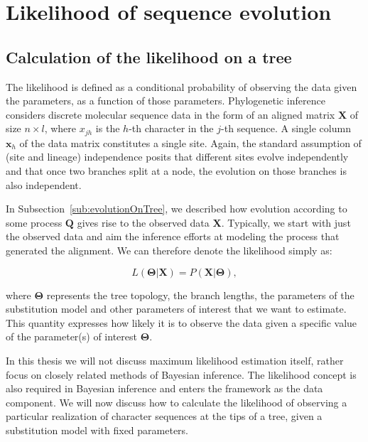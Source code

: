 \section{Likelihood of sequence evolution}

\subsection{Calculation of the likelihood on a tree\label{sub:likelihood}}

The likelihood is defined as a conditional probability of observing the data given the parameters, as a function of those parameters.
Phylogenetic inference considers discrete molecular sequence data in the form of an aligned matrix $\mathbf{X}$ of size $n \times l$, where $x_{jh}$ is the $h$-th character in the $j$-th sequence.
A single column $\mathbf{x}_{h}$ of the data matrix constitutes a single site.
Again, the standard assumption of (site and lineage) independence posits that different sites evolve independently and that once two branches split at a node, the evolution on those branches is also independent.

In Subsection~\ref{sub:evolutionOnTree}, we described how evolution according to some process $\mathbf{Q}$ gives rise to the observed data $\mathbf{X}$.
Typically, we start with just the observed data and aim the inference efforts at modeling the process that generated the alignment.
We can therefore denote the likelihood simply as: 

\begin{equation}
L\left(\mathbf{\Theta}|\mathbf{X}\right)=P\left( \mathbf{X} | \mathbf{\Theta} \right), 
\label{eq:likelihood}
\end{equation}

\noindent
where $\mathbf{\Theta}$ represents the tree topology, the branch lengths, the parameters of the substitution model and other parameters of interest that we want to estimate.
This quantity expresses how likely it is to observe the data given a specific value of the parameter(s) of interest $\mathbf{\Theta}$.

In this thesis we will not discuss maximum likelihood estimation itself, %
rather focus on closely related 
methods of Bayesian inference.
The likelihood concept is also required in Bayesian inference and enters the framework as the data component.
We will now discuss how to calculate the likelihood of observing a particular realization of character sequences at the tips of a tree, given a substitution model with fixed parameters.


